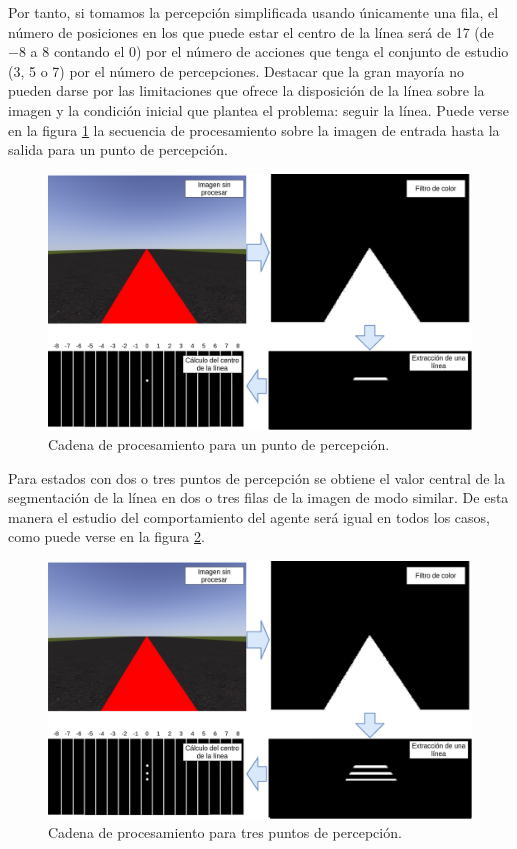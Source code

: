 Por tanto, si tomamos la percepción simplificada usando únicamente una fila, el número de posiciones en los que puede estar el centro de la línea será de 17 (de $-8$ a $8$ contando el $0$) por el número de acciones que tenga el conjunto de estudio (3, 5 o 7) por el número de percepciones. Destacar que la gran mayoría no pueden darse por las limitaciones que ofrece la disposición de la línea sobre la imagen y la condición inicial que plantea el problema: seguir la línea. Puede verse en la figura \ref{fig:pipeline-procesamiento} la secuencia de procesamiento sobre la imagen de entrada hasta la salida para un punto de percepción.

\begin{figure}[!ht]
    \centering \includegraphics[width=1\columnwidth]{./figures/chapter_4/pipeline-procesamiento.png}
    \caption{
        \label{fig:pipeline-procesamiento}
            Cadena de procesamiento para un punto de percepción.
    }
\end{figure}

Para estados con dos o tres puntos de percepción se obtiene el valor central de la segmentación de la línea en dos o tres filas de la imagen de modo similar. De esta manera el estudio del comportamiento del agente será igual en todos los casos, como puede verse en la figura \ref{fig:pipeline-procesamiento-tres-puntos}.\\

\begin{figure}[!ht]
    \centering \includegraphics[width=1\columnwidth]{./figures/chapter_4/pipeline_3_puntos.png}
    \caption{
        \label{fig:pipeline-procesamiento-tres-puntos}
            Cadena de procesamiento para tres puntos de percepción.
    }
\end{figure}

